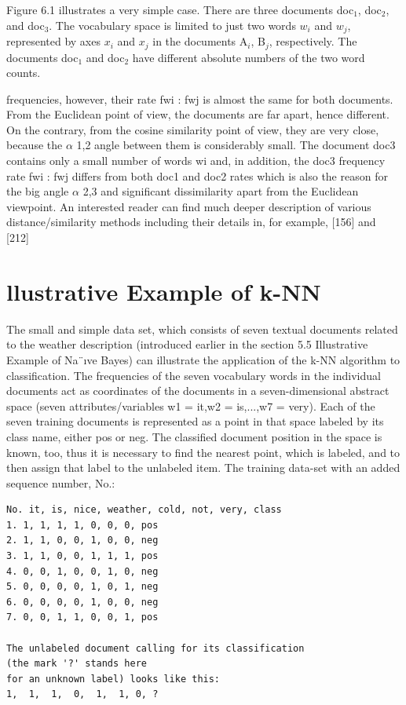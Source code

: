\documentclass[11pt,openany,executivepaper]{book}
\begin{document}
Figure 6.1 illustrates a very simple case. There are three documents doc$_1$, doc$_2$, and doc$_3$.
The vocabulary space is limited to just two words $w_i$ and $w_j$, represented by axes $x_i$ and $x_j$ in the documents A$_i$, B$_j$, respectively.
The documents doc$_1$ and doc$_2$ have different absolute numbers of the two word counts.

frequencies, however, their rate fwi
: fwj
is almost the same for both documents.
From the Euclidean point of view, the documents are far apart, hence different.
On the contrary, from the cosine similarity point of view, they are very close,
because the $\alpha$ 1,2 angle between them is considerably small. The document doc3
contains only a small number of words wi and, in addition, the doc3 frequency
rate fwi
: fwj
differs from both doc1 and doc2 rates which is also the reason for the
big angle $\alpha$ 2,3 and significant dissimilarity apart from the Euclidean viewpoint.
An interested reader can find much deeper description of various distance/similarity methods including their details in, for example, [156] and [212]
\section{llustrative Example of k-NN}

The small and simple data set, which consists of seven textual documents related
to the weather description (introduced earlier in the section 5.5 Illustrative Example of Na¨ıve Bayes) can illustrate the application of the k-NN algorithm to
classification. The frequencies of the seven vocabulary words in the individual
documents act as coordinates of the documents in a seven-dimensional abstract
space (seven attributes/variables w1 = it,w2 = is,...,w7 = very). Each of the
seven training documents is represented as a point in that space labeled by its
class name, either pos or neg.
The classified document position in the space is known, too, thus it is necessary to find the nearest point, which is labeled, and to then assign that label to
the unlabeled item.
The training data-set with an added sequence number, No.:

\begin{verbatim}
No. it, is, nice, weather, cold, not, very, class
1. 1, 1, 1, 1, 0, 0, 0, pos
2. 1, 1, 0, 0, 1, 0, 0, neg
3. 1, 1, 0, 0, 1, 1, 1, pos
4. 0, 0, 1, 0, 0, 1, 0, neg
5. 0, 0, 0, 0, 1, 0, 1, neg
6. 0, 0, 0, 0, 1, 0, 0, neg
7. 0, 0, 1, 1, 0, 0, 1, pos

The unlabeled document calling for its classification 
(the mark '?' stands here
for an unknown label) looks like this:
1,  1,  1,  0,  1,  1, 0, ?
\end{verbatim}
\end{document}

